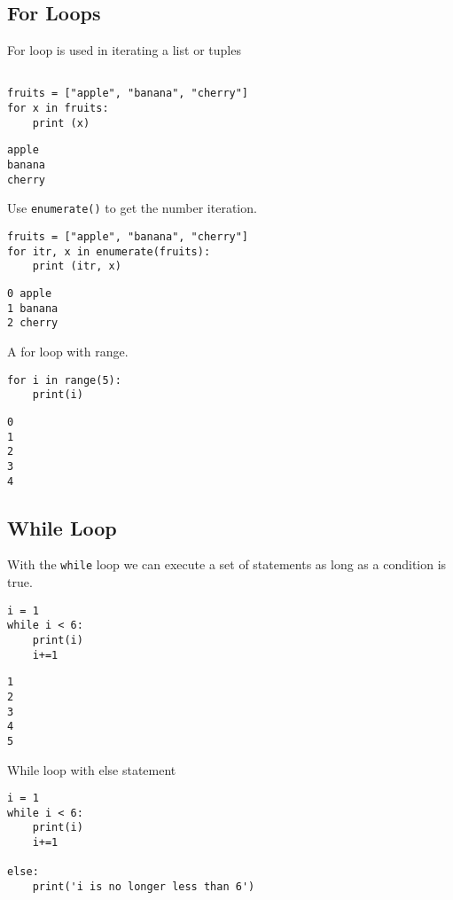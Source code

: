 \documentclass[11pt]{article}
\begin{document}
\subsection{For Loops}
\label{sec:org8cd8017}

For loop is used in iterating a list or tuples
\begin{verbatim}

fruits = ["apple", "banana", "cherry"]
for x in fruits:
    print (x)

\end{verbatim}

\begin{verbatim}
apple
banana
cherry
\end{verbatim}


Use \texttt{enumerate()} to get the number iteration. 

\begin{verbatim}
fruits = ["apple", "banana", "cherry"]
for itr, x in enumerate(fruits):
    print (itr, x)

\end{verbatim}

\begin{verbatim}
0 apple
1 banana
2 cherry
\end{verbatim}


A for loop with range.

\begin{verbatim}
for i in range(5):
    print(i)
\end{verbatim}

\begin{verbatim}
0
1
2
3
4
\end{verbatim}
\subsection{While Loop}
\label{sec:orgad26206}
With the \texttt{while} loop we can execute a set of statements as long as a
condition is true.
\begin{verbatim}
i = 1
while i < 6:
    print(i)
    i+=1
\end{verbatim}

\begin{verbatim}
1
2
3
4
5
\end{verbatim}


While loop with else statement

\begin{verbatim}
i = 1
while i < 6:
    print(i)
    i+=1

else:
    print('i is no longer less than 6')
\end{verbatim}
\end{document}
